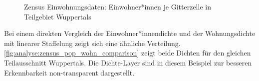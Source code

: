 			\begin{figure}[h]
				\centering
				\caption{Zensus Einwohnungsdaten: Einwohner*innen je Gitterzelle in Teilgebiet Wuppertals}
				\label{fig:analyse:zensus_pop}
			\end{figure}

			Bei einem direkten Vergleich der Einwohner*innendichte und der Wohnungsdichte mit linearer Staffelung zeigt sich eine ähnliche Verteilung. \autoref{fig:analyse:zensus_pop_wohn_comparison} zeigt beide Dichten für den gleichen Teilausschnitt Wuppertals. Die Dichte-Layer sind in diesem Beispiel zur besseren Erkennbarkeit non-transparent dargestellt. 
			
